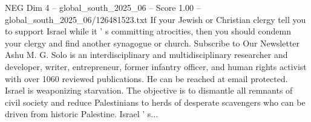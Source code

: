 \begin{textsample}{NEG Dim 4 – global\_south\_2025\_06 – Score 1.00 – global\_south\_2025\_06/126481523.txt}
If your Jewish or Christian clergy tell you to support Israel while it ' s committing atrocities, then you should condemn your clergy and find another synagogue or church.
Subscribe to Our Newsletter Ashu M.
G.
Solo is an interdisciplinary and multidisciplinary researcher and developer, writer, entrepreneur, former infantry officer, and human rights activist with over 1060 reviewed publications.
He can be reached at email protected.
Israel is weaponizing starvation.
The objective is to dismantle all remnants of civil society and reduce Palestinians to herds of desperate scavengers who can be driven from historic Palestine.
Israel ' s...

\end{textsample}
